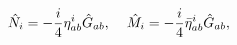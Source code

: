 \begin{equation}
\hat{N}_{i}=-\frac{i}{4}\eta_{ab}^{i}
\hat{G}_{ab}, \hspace{0.4cm}
\hat{M}_{i}=-\frac{i}{4}\bar{\eta}_{ab}^{i}
\hat{G}_{ab}, 
\label{thooftsymbol}
\end{equation}

